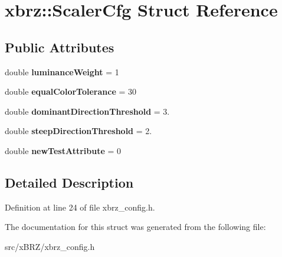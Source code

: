 \hypertarget{structxbrz_1_1ScalerCfg}{\section{xbrz\-:\-:Scaler\-Cfg Struct Reference}
\label{structxbrz_1_1ScalerCfg}
}
\subsection*{Public Attributes}
\begin{DoxyCompactItemize}
\item 
\hypertarget{structxbrz_1_1ScalerCfg_a9bd4e2d43e7b84dd1f14ff3db8e5e354}{double {\bfseries luminance\-Weight} = 1}\label{structxbrz_1_1ScalerCfg_a9bd4e2d43e7b84dd1f14ff3db8e5e354}

\item 
\hypertarget{structxbrz_1_1ScalerCfg_ae066a39571eac3d5befef5756920c4af}{double {\bfseries equal\-Color\-Tolerance} = 30}\label{structxbrz_1_1ScalerCfg_ae066a39571eac3d5befef5756920c4af}

\item 
\hypertarget{structxbrz_1_1ScalerCfg_ab2e0cc75c27bde5e2bda52aa180e7e0e}{double {\bfseries dominant\-Direction\-Threshold} = 3.}\label{structxbrz_1_1ScalerCfg_ab2e0cc75c27bde5e2bda52aa180e7e0e}

\item 
\hypertarget{structxbrz_1_1ScalerCfg_aa51d4ae4ca38c4b5b9bb5db3e2f9656c}{double {\bfseries steep\-Direction\-Threshold} = 2.}\label{structxbrz_1_1ScalerCfg_aa51d4ae4ca38c4b5b9bb5db3e2f9656c}

\item 
\hypertarget{structxbrz_1_1ScalerCfg_a1eb275489edc083c312fd20783a2a81a}{double {\bfseries new\-Test\-Attribute} = 0}\label{structxbrz_1_1ScalerCfg_a1eb275489edc083c312fd20783a2a81a}

\end{DoxyCompactItemize}


\subsection{Detailed Description}


Definition at line 24 of file xbrz\-\_\-config.\-h.



The documentation for this struct was generated from the following file\-:\begin{DoxyCompactItemize}
\item 
src/x\-B\-R\-Z/xbrz\-\_\-config.\-h\end{DoxyCompactItemize}

